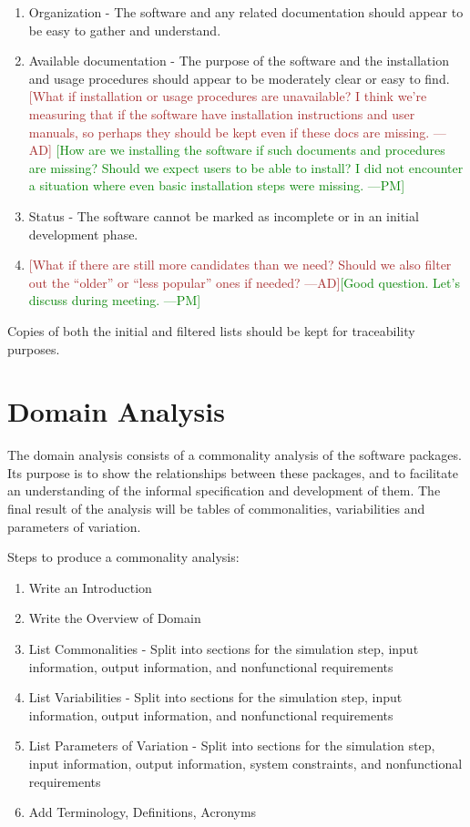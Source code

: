 \documentclass[letterpaper,cleveref]{lipics-v2019}
\newcommand{\authornote}[3]{\textcolor{#1}{[#3 ---#2]}}
\newcommand{\authornote}[3]{}
\newcommand{\pmi}[1]{\authornote{green}{PM}{#1}} %
\newcommand{\ad}[1]{\authornote{brown}{AD}{#1}} %
\theoremstyle{definition}
\begin{document}
\begin{enumerate}
	\item Organization - The software and any related documentation should appear to be easy to gather and understand.
	\item Available documentation - The purpose of the software and the installation and usage procedures should appear to be moderately clear or easy to find.
	\ad{What if installation or usage procedures are unavailable? I think we're measuring that if the software have installation instructions and user manuals,
	so perhaps they should be kept even if these docs are missing.}
    \pmi{How are we installing the software if such documents and procedures are missing? Should we expect users to be able to install? I did not encounter a situation where even basic installation steps were missing.}
	\item Status - The software cannot be marked as incomplete or in an initial development phase.
	\item \ad{What if there are still more candidates than we need? Should we also filter out the ``older'' or ``less popular'' ones if needed? }\pmi{Good question. Let's discuss during meeting.}
\end{enumerate}


Copies of both the initial and filtered lists should be kept for traceability purposes.

\section{Domain Analysis} \label{SecDomainAnalysis}
The domain analysis consists of a commonality analysis of the software packages. Its purpose is to show the relationships between these packages, and to facilitate an understanding of the informal specification and development of them. The final result of the analysis will be tables of commonalities, variabilities and parameters of variation.

\noindent Steps to produce a commonality analysis:
\begin{enumerate}
\item Write an Introduction
\item Write the Overview of Domain
\item List Commonalities - Split into sections for the simulation step, input information, output information, and nonfunctional requirements
\item List Variabilities - Split into sections for the simulation step, input information, output information, and nonfunctional requirements
\item List Parameters of Variation - Split into sections for the simulation step, input information, output information, system constraints, and nonfunctional requirements
\item Add Terminology, Definitions, Acronyms
\end{enumerate}
\end{document}
